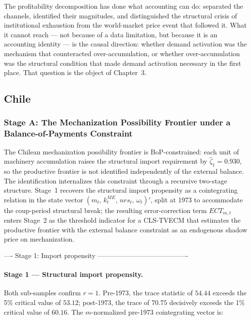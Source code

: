 \documentclass[11pt,a4paper]{article}
\begin{document}
{The profitability decomposition has done what accounting can do:
separated the channels, identified their magnitudes, and distinguished
the structural crisis of institutional exhaustion from the world-market
price event that followed it. What it cannot reach --- not because of
a data limitation, but because it is an accounting identity --- is the
causal direction: whether demand activation was the mechanism that
counteracted over-accumulation, or whether over-accumulation was the
structural condition that made demand activation necessary in the first
place. That question is the object of Chapter~3.



\subsection{Chile}
\label{sec:results_chile}

\subsubsection{Stage A: The Mechanization Possibility Frontier under a
Balance-of-Payments Constraint}
\label{sec:results_cl:stage_a}

The Chilean mechanization possibility frontier is BoP-constrained: each
unit of machinery accumulation raises the structural import requirement
by $\hat{\zeta}_1 = 0.930$, so the productive frontier is not identified
independently of the external balance. The identification internalizes
this constraint through a recursive two-stage structure. Stage~1
recovers the structural import propensity as a cointegrating relation in
the state vector $(m_t,\,k_t^{ME},\,nrs_t,\,\omega_t)'$, split at 1973
to accommodate the coup-period structural break; the resulting
error-correction term $ECT_{m,t}$ enters Stage~2 as the threshold
indicator for a CLS-TVECM that estimates the productive frontier with
the external balance constraint as an endogenous shadow price on
mechanization.

 ---- Stage 1: Import propensity ----------------------------------------

\paragraph{Stage 1 --- Structural import propensity.}

Both sub-samples confirm $r = 1$. Pre-1973, the trace statistic of $54.44$
exceeds the 5\% critical value of $53.12$; post-1973, the trace of $70.75$
decisively exceeds the 1\% critical value of $60.16$. The $m$-normalized pre-1973
cointegrating vector is:

}
\end{document}
